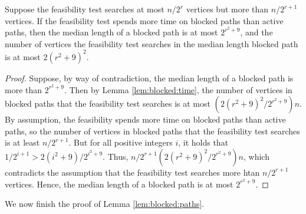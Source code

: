 \documentclass[12pt]{article}
\begin{document}
\begin{spacing}{3}
\begin{lemma}
\label{lem:median:blocked}
Suppose the feasibility test searches at most $n/2^r$ vertices but more than $n/2^{r+1}$ vertices. If the feasibility test spends more time on blocked paths than active paths, then the median length of a blocked path is at most $2^{r^2+9}$, and the number of vertices the feasibility test searches in the median length blocked path is at most $2(r^2+9)^2$.
\end{lemma}
\begin{proof}
Suppose, by way of contradiction, the median length of a blocked path is more than $2^{r^2+9}$. Then by Lemma \ref{lem:blocked:time}, the number of vertices in blocked paths that the feasibility test searches is at most $\left(2(r^2+9)^2/2^{r^2+9}\right)n$. By assumption, the feasibility spends more time on blocked paths than active paths, so the number of vertices in blocked paths that the feasibility test searches is at least $n/2^{r+1}$. But for all positive integers $i$, it holds that $1/2^{i+1}>2(i^2+9)/2^{i^2+9}$. Thus, $n/2^{r+1}\left(2(r^2+9)^2/2^{r^2+9}\right)n$, which contradicts the assumption that the feasibility test searches more htan $n/2^{r+1}$ vertices. Hence, the median length of a blocked path is at most $2^{r^2+9}$.
\end{proof}

\noindent
We now finish the proof of Lemma \ref{lem:blocked:paths}.


\end{spacing}
\end{document}
